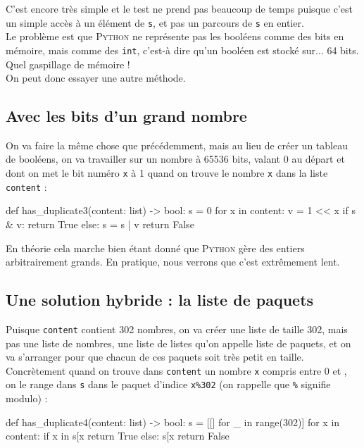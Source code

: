\documentclass[a4paper,12pt,french]{book}
\begin{document}
C'est encore très simple et le test  ne prend pas beaucoup de temps puisque c'est un simple accès à un élément de \texttt{s}, et pas un parcours de \texttt{s} en entier.\\
Le problème est que \textsc{Python} ne représente pas les booléens comme des bits en mémoire, mais comme des \texttt{int}, c'est-à dire qu'un booléen est stocké sur... 64 bits. Quel gaspillage de mémoire !\\
On peut donc essayer une autre méthode.

\subsection{Avec les bits d'un grand nombre}

On va faire la même chose que précédemment, mais au lieu de créer un tableau de  booléens, on va travailler sur un nombre à 65536 bits, valant 0 au départ et dont on met le bit numéro \texttt{x} à 1 quand on trouve le nombre \texttt{x} dans la liste \texttt{content} :
\begin{pythoncode}
def has_duplicate3(content: list) -> bool:
    s = 0
    for x in content:
        v = 1 << x
        if s & v:
            return True
        else:
            s = s | v
    return False
\end{pythoncode}
En théorie cela marche bien étant donné que \textsc{Python} gère des entiers arbitrairement grands. En pratique, nous verrons que c'est extrêmement lent.

\subsection{Une solution hybride : la liste de paquets}

Puisque \texttt{content} contient 302 nombres, on va créer une liste de taille 302, mais pas une liste de nombres, une liste de listes qu'on appelle liste de paquets, et on va s'arranger pour que chacun de ces paquets soit très petit en taille. Concrètement quand on trouve dans \texttt{content} un nombre \texttt{x} compris entre 0 et , on le range dans \texttt{s} dans le paquet d'indice \texttt{x\%302} (on rappelle que \texttt{\%} signifie modulo) :

\begin{pythoncode}
def has_duplicate4(content: list) -> bool:
    s = [[] for _ in range(302)]
    for x in content:
        if x in s[x %
            return True
        else:
            s[x %
    return False
\end{pythoncode}
\end{document}
